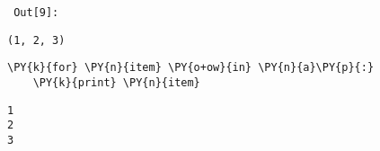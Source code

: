 \par\vspace{1\smallerfontscale}%
    
        {\par%
        \vspace{-1\smallerfontscale}%
        \noindent%
        \begin{minipage}{\cellleftmargin}%
    \hfill%
    {\smaller%
    \tt%
    \color{nbframe-out-prompt}%
    Out[9]:}%
    \hspace{\inputpadding}%
    \hspace{0em}%
    \hspace{3pt}%
    \end{minipage}%
        }%
    \begin{addmargin}[\cellleftmargin]{0em}%
    {\smaller%
    \vspace{-1\smallerfontscale}%
    
    
    
    \begin{verbatim}
(1, 2, 3)
    \end{verbatim}

    
}%
    \end{addmargin}%

{\par%
\vspace{-1\baselineskip}%
}%
\begin{notebookcell}[11]%
\begin{addmargin}[\cellleftmargin]{0em}%
{\smaller%
\par%
%
\vspace{-1\smallerfontscale}%
\begin{Verbatim}[commandchars=\\\{\}]
\PY{k}{for} \PY{n}{item} \PY{o+ow}{in} \PY{n}{a}\PY{p}{:}
    \PY{k}{print} \PY{n}{item}
\end{Verbatim}
%
\par%
\vspace{-1\smallerfontscale}}%
\end{addmargin}
\end{notebookcell}

\par\vspace{1\smallerfontscale}%
    \begin{addmargin}[\cellleftmargin]{0em}%
    {\smaller%
    \vspace{-1\smallerfontscale}%
    
    \begin{Verbatim}[commandchars=\\\{\}]
1
2
3
    \end{Verbatim}
}%
    \end{addmargin}%

